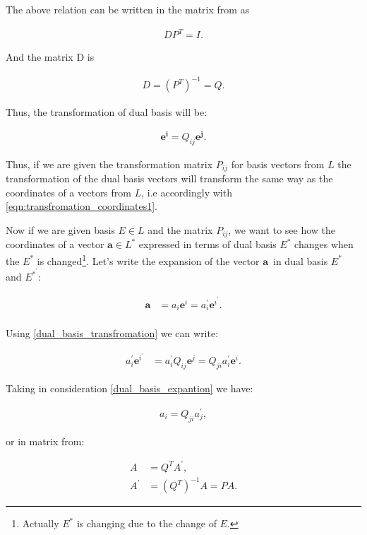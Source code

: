 \documentclass{book}
\begin{document}
The above relation can be written in the matrix from as

\begin{align}
 DP^{T} = I.
\end{align}

And the matrix D is

\begin{align}
 D = (P^T)^{-1} = Q.
\end{align}

Thus, the transformation of dual basis will be:

\begin{align}
\boldsymbol{e^i} = Q_{ij}\boldsymbol{e^{j}}. \label{dual_basis_transfromation}
\end{align}

Thus, if we are given the transformation matrix $P_{ij}$ for basis vectors from $L$ the transformation of the dual basis vectors will transform the same way as the coordinates of a vectors from $L$, i.e accordingly with \eqref{eqn:transfromation_coordinates1}.

Now if we are given basis $E \in L$ and the matrix $P_{ij}$, we want to see how the coordinates of a vector $\boldsymbol{a} \in L^{*}$ expressed in terms of dual basis $E^*$ changes when the $E^*$ is changed\footnote{Actually $E^*$ is changing due to the change of $E$.}. Let's write the expansion of the vector $\boldsymbol{a}$\ in dual basis $E^*$ and $E^{*}^{'}$:

\begin{align*}
\boldsymbol{a} &= a_{i}\boldsymbol{e}^{i} = a_{i}^{'}\boldsymbol{e}^{i}^{'}. \label{dual_basis_expantion} \\
\end{align*}

Using \eqref{dual_basis_transfromation} we can write:

\begin{align*}
a_{i}^{'}\boldsymbol{e}^{i}^{'} &= a_{i}^{'}Q_{ij}\boldsymbol{e}^{j} = Q_{ji} a_{i}^{'}\boldsymbol{e}^{i}.
\end{align*}

Taking in consideration \eqref{dual_basis_expantion} we have:

\begin{align*}
a_{i} = Q_{ji}a_{j}^{'},
\end{align*}

or in matrix from:

\begin{align*}
A &= Q^{T}A^{'}, \\
A^{'} &= (Q^{T})^{-1}A = PA.
\end{align*}
\end{document}
